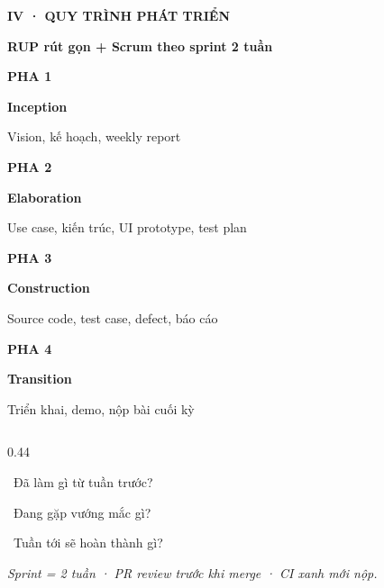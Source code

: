 \documentclass[aspectratio=169,10pt]{beamer}
\newcommand{\kick}[1]{{\headfont\bfseries\footnotesize\textcolor{mred}{\MakeUppercase{#1}}}}
\newcommand{\slidehead}[2]{%
  \kick{#1}\par\vspace{0.6mm}%
  {\headfont\bfseries\LARGE\textcolor{ink}{#2}}\par\vspace{1.2mm}}
\begin{document}
\begin{frame}
\slidehead{IV · Quy trình phát triển}{RUP rút gọn + Scrum theo sprint 2 tuần}
\vspace{0.5mm}\footnotesize
\begin{tcbraster}[raster columns=4, raster equal height=rows, raster column skip=2.4mm]
\begin{tcolorbox}[card]{\kick{Pha 1}}\par{\headfont\bfseries Inception}\par\textcolor{slate}{Vision, kế hoạch, weekly report}\end{tcolorbox}
\begin{tcolorbox}[card]{\kick{Pha 2}}\par{\headfont\bfseries Elaboration}\par\textcolor{slate}{Use case, kiến trúc, UI prototype, test plan}\end{tcolorbox}
\begin{tcolorbox}[card]{\kick{Pha 3}}\par{\headfont\bfseries Construction}\par\textcolor{slate}{Source code, test case, defect, báo cáo}\end{tcolorbox}
\begin{tcolorbox}[creamcard]{\kick{Pha 4}}\par{\headfont\bfseries Transition}\par\textcolor{slate}{Triển khai, demo, nộp bài cuối kỳ}\end{tcolorbox}
\end{tcbraster}
\vspace{2mm}
\begin{columns}[t]
\begin{column}{0.44\textwidth}
\begin{tcolorbox}[darkcard,title={WEEKLY SCRUM},height=3.1cm]\footnotesize\color{white}
\textcolor{mred}{\textbullet}\ Đã làm gì từ tuần trước?\par\vspace{1.2mm}
\textcolor{mred}{\textbullet}\ Đang gặp vướng mắc gì?\par\vspace{1.2mm}
\textcolor{mred}{\textbullet}\ Tuần tới sẽ hoàn thành gì?\par\vspace{1.6mm}
{\itshape\textcolor{softwhite}{Sprint = 2 tuần · PR review trước khi merge · CI xanh mới nộp.}}

\end{tcolorbox}
\end{column}
\end{columns}
\end{frame}
\end{document}
